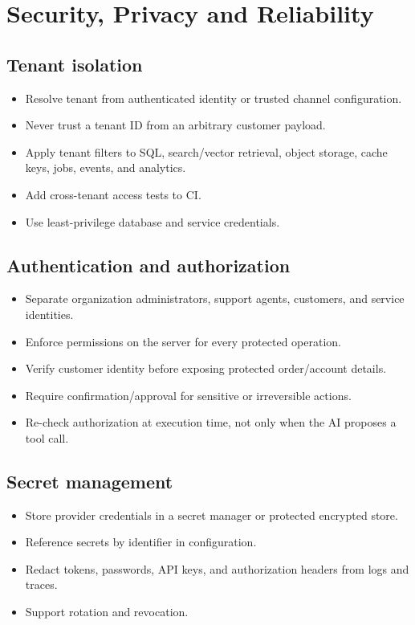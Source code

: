 \chapter{Security, Privacy and Reliability}

\section{Tenant isolation}

\begin{itemize}
\item Resolve tenant from authenticated identity or trusted channel configuration.
\item Never trust a tenant ID from an arbitrary customer payload.
\item Apply tenant filters to SQL, search/vector retrieval, object storage, cache keys, jobs, events, and analytics.
\item Add cross-tenant access tests to CI.
\item Use least-privilege database and service credentials.
\end{itemize}
\section{Authentication and authorization}

\begin{itemize}
\item Separate organization administrators, support agents, customers, and service identities.
\item Enforce permissions on the server for every protected operation.
\item Verify customer identity before exposing protected order/account details.
\item Require confirmation/approval for sensitive or irreversible actions.
\item Re-check authorization at execution time, not only when the AI proposes a tool call.
\end{itemize}
\section{Secret management}

\begin{itemize}
\item Store provider credentials in a secret manager or protected encrypted store.
\item Reference secrets by identifier in configuration.
\item Redact tokens, passwords, API keys, and authorization headers from logs and traces.
\item Support rotation and revocation.
\end{itemize}
